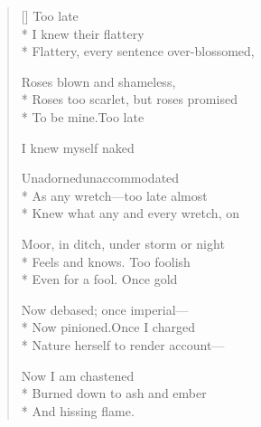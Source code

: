 \label{ch:lear_az}
\settowidth{\versewidth}{Flattery, every sentence over-blossomed,}
\begin{verse}[\versewidth]
 \hspace*{3\vgap} Too late\\*
I knew their flattery\\*
Flattery, every sentence over-blossomed,

Roses blown and shameless,\\*
Roses too scarlet, but roses promised\\*
To be mine.\qquad Too late

I knew myself naked

Unadorned\quad unaccommodated\\*
As any wretch---too late almost\\*
Knew what any and every wretch, on

Moor, in ditch, under storm or night\\*
Feels and knows.   Too foolish\\*
Even for a fool.   Once gold

Now debased; once imperial---\\*
Now pinioned.\quad Once I charged\\*
Nature herself to render account---

Now I am chastened\\*
Burned down to ash and ember\\*
And hissing flame.
\end{verse}
